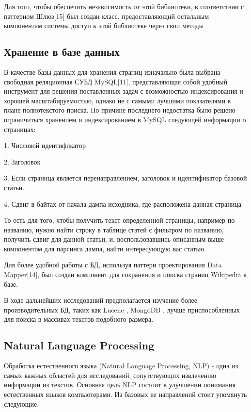 Для того, чтобы обеспечить независимость от этой библиотеки, в соответствии
с паттерном Шлюз[15] был создан класс, предоставляющий остальным компонентам системы
доступ к этой библиотеке через свои методы

\subsection{Хранение в базе данных}

В качестве базы данных для хранения страниц изначально была выбрана свободная реляционная 
СУБД MySQL[11], представляющая собой удобный инструмент для решения поставленных 
задач с возможностью индексирования и хорошей масштабируемостью, однако не с самыми
лучшими показателями в плане полнотекстого поиска. По причине последнего недостатка было 
решено ограничиться хранением и индексированием в MySQL следующей информации о страницах:

1. Числовой идентификатор

2. Заголовок

3. Если страница является перенаправлением, заголовок и идентификатор  базовой статьи.

4. Сдвиг в байтах от начала дампа-исходника, где расположена данная страница

То есть для того, чтобы получить текст определенной страницы, например по названию,
нужно найти строку в таблице статей с фильтром по названию,
получить сдвиг для данной статьи, и, воспользовавшись
описанным выше компонентом для парсинга дампа, найти интересующую вас статью.

Для более удобной работы с БД, используя паттерн проектирования Data Mapper[14], 
был создан компонент для сохранения и поиска страниц Wikipedia в базе.

В ходе дальнейших исследований предполагается изучение более производительных БД, таких
как Lucene \cite{lucene}, MongoDB \cite{mongoDB}, лучше приспособленных для поиска в
массивах текстов подобного размера.

\subsection{Natural Language Processing}

Обработка естественного языка (Natural Language Processing, NLP)\cite{textminingsurvey} - одна из самых 
важных областей для исследований, сопутствующих извлечению информации из текстов.
Основная цель NLP состоит в улучшении понимания естественных языков компьютерами.
Из базовых ее направлений стоит упомянуть следующие.


